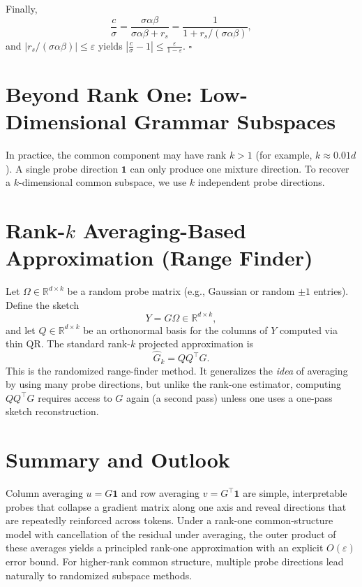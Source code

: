 \documentclass[11pt]{book}
\begin{document}
Finally,
\[
\frac{c}{\sigma}=\frac{\sigma\alpha\beta}{\sigma\alpha\beta+r_s}
=\frac{1}{1+r_s/(\sigma\alpha\beta)},
\]
and $|r_s/(\sigma\alpha\beta)|\le\varepsilon$ yields
$\left|\frac{c}{\sigma}-1\right|\le \frac{\varepsilon}{1-\varepsilon}$.
\hfill$\square$

\section{Beyond Rank One: Low-Dimensional Grammar Subspaces}

In practice, the common component may have rank $k>1$ (for example, $k\approx 0.01d$).
A single probe direction $\mathbf{1}$ can only produce one mixture direction.
To recover a $k$-dimensional common subspace, we use $k$ independent probe directions.

\section{Rank-$k$ Averaging-Based Approximation (Range Finder)}

Let $\Omega \in \mathbb{R}^{d \times k}$ be a random probe matrix (e.g., Gaussian
or random $\pm 1$ entries). Define the sketch
\[
Y = G \Omega \in \mathbb{R}^{d \times k},
\]
and let $Q\in\mathbb{R}^{d\times k}$ be an orthonormal basis for the columns of $Y$
computed via thin QR. The standard rank-$k$ projected approximation is
\[
\widehat{G}_k = Q Q^\top G.
\]
This is the randomized range-finder method. It generalizes the \emph{idea} of averaging
by using many probe directions, but unlike the rank-one estimator, computing $QQ^\top G$
requires access to $G$ again (a second pass) unless one uses a one-pass sketch
reconstruction.

\section{Summary and Outlook}

Column averaging $u=G\mathbf{1}$ and row averaging $v=G^\top\mathbf{1}$ are simple,
interpretable probes that collapse a gradient matrix along one axis and reveal
directions that are repeatedly reinforced across tokens.
Under a rank-one common-structure model with cancellation of the residual under
averaging, the outer product of these averages yields a principled rank-one
approximation with an explicit $O(\varepsilon)$ error bound.
For higher-rank common structure, multiple probe directions lead naturally to
randomized subspace methods.
\end{document}
